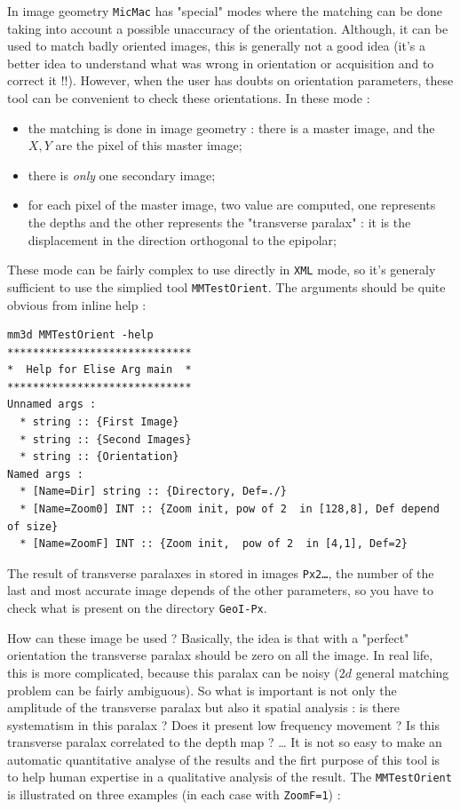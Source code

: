 In image geometry {\tt MicMac} has "special" modes where the matching can be done
taking into account a possible unaccuracy of the orientation. Although, it can be used
to match badly oriented images, this is generally not a good idea (it's a better idea to
understand what was wrong in orientation or acquisition and to correct it !!). However,
when the user has doubts on orientation parameters, these tool can  be convenient to check
these orientations. In these mode :

\begin{itemize}
   \item the matching is done in image geometry : there is a master image, and the $X,Y$
         are the pixel of this master image;
   \item there is \emph{only} one secondary image;
   \item for each pixel of the master image, two value are computed, one represents the depths
         and the other represents the "transverse paralax" : it is the displacement in the direction
         orthogonal to the epipolar;
\end{itemize}

These mode can be fairly complex to use directly in {\tt XML} mode, so it's generaly sufficient
to use the simplied tool {\tt MMTestOrient}. The  arguments should be quite obvious from
inline help :

\begin{verbatim}
mm3d MMTestOrient -help
*****************************
*  Help for Elise Arg main  *
*****************************
Unnamed args : 
  * string :: {First Image}
  * string :: {Second Images}
  * string :: {Orientation}
Named args : 
  * [Name=Dir] string :: {Directory, Def=./}
  * [Name=Zoom0] INT :: {Zoom init, pow of 2  in [128,8], Def depend of size}
  * [Name=ZoomF] INT :: {Zoom init,  pow of 2  in [4,1], Def=2}
\end{verbatim}

The result of transverse paralaxes in stored in images {\tt Px2\dots}, the number of the last
and most accurate image depends of the other parameters, so you have to check what is 
present on the directory {\tt GeoI-Px}. 

How can these image be used ? Basically, the idea is that with a "perfect" orientation the 
transverse paralax should be zero on all the image. In real life, this is more complicated, because this
paralax can be noisy ($2d$ general matching problem can be fairly ambiguous). So what is important is not
only the amplitude of the transverse paralax but also it spatial analysis : is there systematism in
this paralax ? Does it present low frequency movement ? Is this transverse paralax correlated to the
depth map ? \dots 
It is not so easy to make an automatic quantitative analyse 
of the results and the firt purpose of this tool is to help human expertise in a qualitative analysis of
the result.  The {\tt MMTestOrient} is illustrated on three examples (in each case with {\tt ZoomF=1}) :

